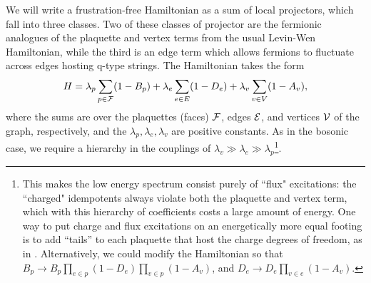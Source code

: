 We will write a frustration-free Hamiltonian as a sum of local projectors, which fall into
three classes.
Two of these classes of projector are the fermionic analogues of the plaquette and vertex terms from the usual Levin-Wen Hamiltonian, 
while the third is an edge term which allows fermions to fluctuate across edges hosting q-type strings.
The Hamiltonian takes the form
\begin{align} \label{ham}
H = \lambda_p \sum_{p \in \mathcal{F}} (1-B_p) + \lambda_e \sum_{e \in E} (1-D_e) + \lambda_v \sum_{v \in V} (1-A_v),
\end{align}
where the sums are over the plaquettes (faces) $\mathcal{F}$, edges $\mathcal{E}$, and vertices $\mathcal{V}$ of the graph, 
respectively, and the $\lambda_p,\lambda_e,\lambda_v$ are positive constants.
As in the bosonic case, we require a hierarchy in the couplings of $\lambda_v \gg \lambda_e \gg \lambda_p$\footnote{This makes the low energy spectrum consist purely of ``flux" excitations: 
the ``charged" idempotents always violate both the plaquette and vertex term, which with this hierarchy of coefficients costs a large amount of energy. 
One way to put charge and flux excitations on an energetically more equal footing is to add ``tails'' to each 
plaquette that host the charge degrees of freedom, as in \cite{Hu2015}.
Alternatively, we could modify the Hamiltonian so that $B_p \rightarrow B_p \prod_{e \in p} (1-D_e) \prod_{v \in p} (1-A_v)$, and $D_e \rightarrow D_e \prod_{v \in e} (1-A_v)$.
}.
